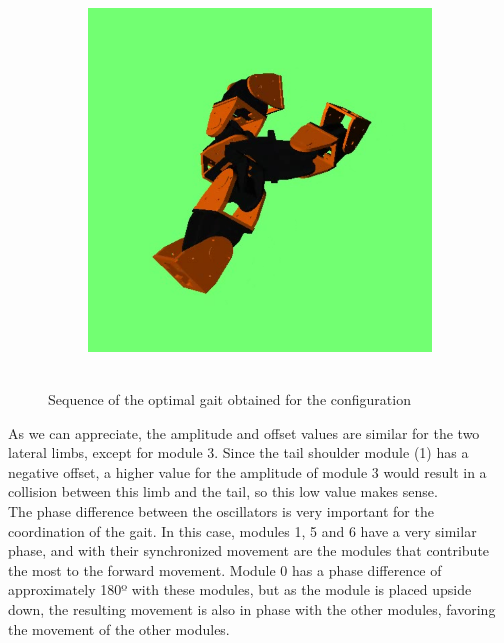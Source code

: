 \begin{figure}[h]
\begin{subfigure}[b]{0.18\textwidth}
                 \\~
        \end{subfigure}
        ~
        \begin{subfigure}[b]{0.18\textwidth}
         	   \centering
                \includegraphics[width=\textwidth]{images/results_7_gait_09.png}
                 \\~
        \end{subfigure}
        \caption{Sequence of the optimal gait obtained for the \robotSeven configuration}
        \label{fig:result_7_gait}
\end{figure}

As we can appreciate, the amplitude and offset values are similar for the two lateral limbs, except for module 3. Since the tail shoulder module (1) has a negative offset, a higher value for the amplitude of module 3 would result in a collision between this limb and the tail, so this low value makes sense.\\

The phase difference between the oscillators is very important for the coordination of the gait. In this case, modules 1, 5 and 6 have a very similar phase, and with their synchronized movement are the modules that contribute the most to the forward movement. Module 0 has a phase difference of approximately 180º with these modules, but as the module is placed upside down, the resulting movement is also in phase with the other modules, favoring the movement of the other modules.\\

